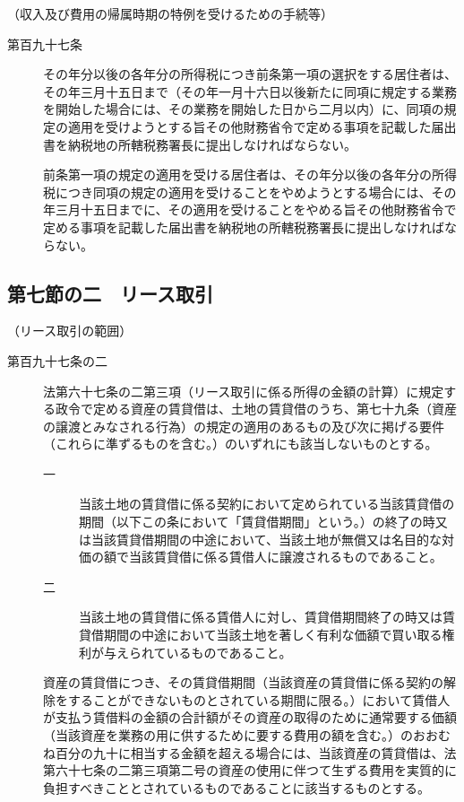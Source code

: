 \documentclass[twocolumn,a4j,10pt]{ltjtarticle}
\begin{document}
\noindent\hspace{10pt}（収入及び費用の帰属時期の特例を受けるための手続等）
\begin{description}
\item[第百九十七条]その年分以後の各年分の所得税につき前条第一項の選択をする居住者は、その年三月十五日まで（その年一月十六日以後新たに同項に規定する業務を開始した場合には、その業務を開始した日から二月以内）に、同項の規定の適用を受けようとする旨その他財務省令で定める事項を記載した届出書を納税地の所轄税務署長に提出しなければならない。
\item[]前条第一項の規定の適用を受ける居住者は、その年分以後の各年分の所得税につき同項の規定の適用を受けることをやめようとする場合には、その年三月十五日までに、その適用を受けることをやめる旨その他財務省令で定める事項を記載した届出書を納税地の所轄税務署長に提出しなければならない。
\end{description}
\subsection*{第七節の二　リース取引}
\noindent\hspace{10pt}（リース取引の範囲）
\begin{description}
\item[第百九十七条の二]法第六十七条の二第三項（リース取引に係る所得の金額の計算）に規定する政令で定める資産の賃貸借は、土地の賃貸借のうち、第七十九条（資産の譲渡とみなされる行為）の規定の適用のあるもの及び次に掲げる要件（これらに準ずるものを含む。）のいずれにも該当しないものとする。
\begin{description}
\item[一]当該土地の賃貸借に係る契約において定められている当該賃貸借の期間（以下この条において「賃貸借期間」という。）の終了の時又は当該賃貸借期間の中途において、当該土地が無償又は名目的な対価の額で当該賃貸借に係る賃借人に譲渡されるものであること。
\item[二]当該土地の賃貸借に係る賃借人に対し、賃貸借期間終了の時又は賃貸借期間の中途において当該土地を著しく有利な価額で買い取る権利が与えられているものであること。
\end{description}
\item[]資産の賃貸借につき、その賃貸借期間（当該資産の賃貸借に係る契約の解除をすることができないものとされている期間に限る。）において賃借人が支払う賃借料の金額の合計額がその資産の取得のために通常要する価額（当該資産を業務の用に供するために要する費用の額を含む。）のおおむね百分の九十に相当する金額を超える場合には、当該資産の賃貸借は、法第六十七条の二第三項第二号の資産の使用に伴つて生ずる費用を実質的に負担すべきこととされているものであることに該当するものとする。
\end{description}
\end{document}
